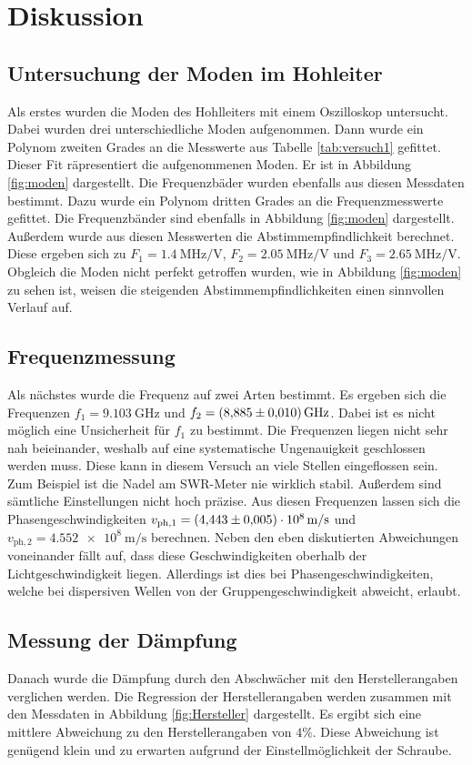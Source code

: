 \chapter{Diskussion}
\label{cha:Diskussion}
\section{Untersuchung der Moden im Hohleiter}
Als erstes wurden die Moden des Hohlleiters mit einem Oszilloskop untersucht. Dabei wurden drei unterschiedliche Moden aufgenommen. Dann wurde ein Polynom zweiten Grades an die 
Messwerte aus Tabelle \ref{tab:versuch1} gefittet. Dieser Fit räpresentiert die aufgenommenen Moden. Er ist in Abbildung \ref{fig:moden} dargestellt. Die Frequenzbäder wurden 
ebenfalls aus diesen Messdaten bestimmt. Dazu wurde ein Polynom dritten Grades an die Frequenzmesswerte gefittet. Die Frequenzbänder sind ebenfalls in Abbildung \ref{fig:moden} 
dargestellt. Außerdem wurde aus diesen Messwerten die Abstimmempfindlichkeit berechnet. Diese ergeben sich zu $F_1 = \qty{1.4}{\mega\hertz\per\volt}$, 
$F_2 = \qty{2.05}{\mega\hertz\per\volt}$ und $F_3 = \qty{2.65}{\mega\hertz\per\volt}$. Obgleich die Moden nicht perfekt getroffen wurden, wie in Abbildung \ref{fig:moden} zu sehen ist, 
weisen die steigenden Abstimmempfindlichkeiten einen sinnvollen Verlauf auf.
\section{Frequenzmessung}
Als nächstes wurde die Frequenz auf zwei Arten bestimmt. Es ergeben sich die Frequenzen $f_1 = \qty{9,103}{\giga\hertz}$ und $f_2 = \qty{8,885 +- 0,01}{\giga\hertz}$. Dabei ist es 
nicht möglich eine Unsicherheit für $f_1$ zu bestimmt. Die Frequenzen liegen nicht sehr nah beieinander, weshalb auf eine systematische Ungenauigkeit geschlossen werden muss. Diese 
kann in diesem Versuch an viele Stellen eingeflossen sein. Zum Beispiel ist die Nadel am SWR-Meter nie wirklich stabil. Außerdem sind sämtliche Einstellungen nicht hoch präzise.
Aus diesen Frequenzen lassen sich die Phasengeschwindigkeiten $v_{\mathrm{ph, 1}} = \qty{4,443(0,005)e8}{\metre\per\second}$ und 
$v_{\mathrm{ph, 2}} = \qty{4,552e8}{\metre\per\second}$ berechnen. Neben den eben diskutierten Abweichungen voneinander fällt auf, dass diese Geschwindigkeiten oberhalb der 
Lichtgeschwindigkeit liegen. Allerdings ist dies bei Phasengeschwindigkeiten, welche bei dispersiven Wellen von der Gruppengeschwindigkeit abweicht, erlaubt.
\section{Messung der Dämpfung}
Danach wurde die Dämpfung durch den Abschwächer mit den Herstellerangaben verglichen werden. Die Regression der Herstellerangaben werden zusammen mit den Messdaten in Abbildung 
\ref{fig:Hersteller} dargestellt. Es ergibt sich eine mittlere Abweichung zu den Herstellerangaben von $4\%$. Diese Abweichung ist genügend klein und zu erwarten aufgrund der 
Einstellmöglichkeit der Schraube.
